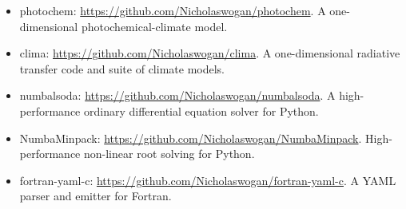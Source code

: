 \documentclass{article}
\begin{document}
\begin{itemize}
  \item photochem: \url{https://github.com/Nicholaswogan/photochem}. A one-dimensional photochemical-climate model.
  \item clima: \url{https://github.com/Nicholaswogan/clima}. A one-dimensional radiative transfer code and suite of climate models. 
  \item numbalsoda: \url{https://github.com/Nicholaswogan/numbalsoda}. A high-performance ordinary differential equation solver for Python.
  \item NumbaMinpack: \url{https://github.com/Nicholaswogan/NumbaMinpack}. High-performance non-linear root solving for Python.
  \item fortran-yaml-c: \url{https://github.com/Nicholaswogan/fortran-yaml-c}. A YAML parser and emitter for Fortran.
\end{itemize}
\end{document}
